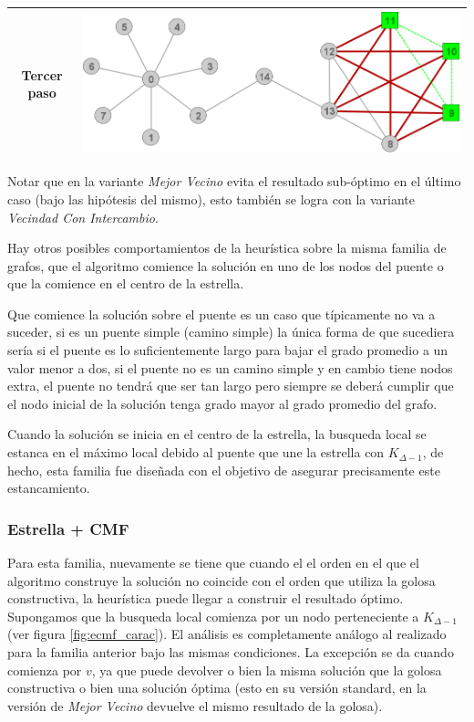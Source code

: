 \begin{itemize}
\begin{center}
\begin{tabular}{|c||c|}
		\hline
		Tercer paso &
		\includegraphics[scale = 0.2]{img/ej3/busqueda_local/estrellaPuenteCMFPar_st03.png} \\
		\hline

	\end{tabular}
	\end{center}


\end{itemize}

Notar que en la variante \emph{Mejor Vecino} evita el resultado sub-\'optimo en 
el \'ultimo caso (bajo las hip\'otesis del mismo), esto tambi\'en se logra con
la variante \emph{Vecindad Con Intercambio}.

Hay otros posibles comportamientos de la heur\'istica sobre la misma familia de
grafos, que el algoritmo comience la soluci\'on en uno de los nodos del puente o
que la comience en el centro de la estrella.

Que comience la soluci\'on sobre el puente es un caso que t\'ipicamente no va a 
suceder, si es un puente simple (camino simple) la \'unica forma de que sucediera
ser\'ia si el puente es lo suficientemente largo para bajar el grado promedio a
un valor menor a dos, si el puente no es un camino simple y en cambio tiene nodos
extra, el puente no tendr\'a que ser tan largo pero siempre se deber\'a cumplir
que el nodo inicial de la soluci\'on tenga grado mayor al grado promedio del grafo.

Cuando la soluci\'on se inicia en el centro de la estrella, la busqueda local 
se estanca en el m\'aximo local debido al puente que une la estrella con $K_{\Delta -1}$,
de hecho, esta familia fue dise\~nada con el objetivo de asegurar precisamente
este estancamiento.
		
\subsubsection{Estrella + CMF}

Para esta familia, nuevamente se tiene que cuando el el orden en el que el algoritmo
construye la soluci\'on no coincide con el orden que utiliza la golosa constructiva, 
la heur\'istica puede llegar a construir el resultado \'optimo.
Supongamos que la busqueda local comienza por un nodo perteneciente a $K_{\Delta -1}$
(ver figura \ref{fig:ecmf_carac}). El an\'alisis es completamente an\'alogo al
realizado para la familia anterior bajo las mismas condiciones. La excepci\'on
se da cuando comienza por $v$, ya que puede devolver o bien la misma soluci\'on que
la golosa constructiva o bien una soluci\'on \'optima (esto en su versi\'on standard, 
en la versi\'on de \emph{Mejor Vecino} devuelve el mismo resultado de la golosa).

